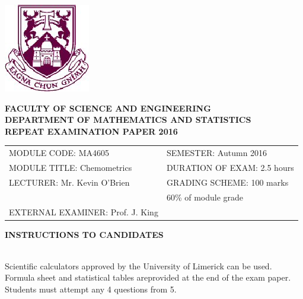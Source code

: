 \documentclass[a4paper,12pt]{article}
\begin{document}
\begin{center}
\includegraphics[scale=0.65]{images/shieldtransparent2}
\end{center}

\begin{center}
\vspace{1cm}
\large \bf {FACULTY OF SCIENCE AND ENGINEERING} \\[0.5cm]
\normalsize DEPARTMENT OF MATHEMATICS AND STATISTICS \\[1.25cm]
\large \bf {REPEAT EXAMINATION PAPER 2016} \\[1.5cm]
\end{center}

\begin{tabular}{ll}
MODULE CODE: MA4605 & SEMESTER: Autumn 2016 \\[1cm]
MODULE TITLE: Chemometrics & DURATION OF EXAM: 2.5 hours \\[1cm]
LECTURER: Mr. Kevin O'Brien & GRADING SCHEME: 100 marks \\
& \phantom{GRADING SCHEME:} \footnotesize {60\% of module grade} \\[0.8cm]
EXTERNAL EXAMINER: Prof. J. King & \\
\end{tabular}
\bigskip
\begin{center}
{\bf INSTRUCTIONS TO CANDIDATES}
\end{center}

{\noindent \\ Scientific calculators approved by the University of Limerick can be used. \\
Formula sheet and statistical tables areprovided at the end of the exam paper.\\
Students must attempt any 4 questions from 5.}
\newpage



\end{document}
